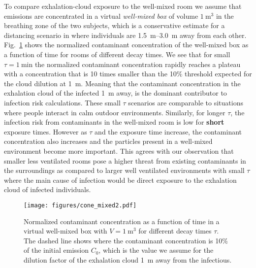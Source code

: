 \documentclass[preprint]{elsarticle}
\begin{document}
To compare exhalation-cloud exposure to the well-mixed room we assume that emissions are concentrated in a virtual \emph{well-mixed box} of volume $\SI{1}{\meter^{3}}$ in the breathing zone of the two subjects, which is a conservative estimate for a distancing scenario in where individuals are \SIrange[range-phrase=-]{1.5}{3.0}{\meter} away from each other.
Fig.~\ref{fig:dose ratio} shows the normalized contaminant concentration of the well-mixed box as a function of time for rooms of different decay times. 
We see that for small $\tau=\SI{1}{\minute}$ the normalized contaminant concentration rapidly reaches a plateau with a concentration that is 10 times smaller than the 10\% threshold expected for the cloud dilution at \SI{1}{\meter}.
Meaning that the contaminant concentration in the exhalation cloud of the infected \SI{1}{\meter} away, is the dominant contributor to infection risk calculations.
These small $\tau$ scenarios are comparable to situations where people interact in calm outdoor environments.
Similarly, for longer $\tau$, the infection risk from contaminants in the well-mixed room is low for \textbf{short} exposure times. 
However as $\tau$ and the exposure time increase, the contaminant concentration also increases and the particles present in a well-mixed environment become more important.
This agrees with our observation that smaller less ventilated rooms pose a higher threat from existing contaminants in the surroundings as compared to larger well ventilated environments with small $\tau$ where the main cause of infection would be direct exposure to the exhalation cloud of infected individuals.


\begin{figure}[!htbp]
	\centering
	\texttt{[image: figures/cone\_mixed2.pdf]}
	\caption{Normalized contaminant concentration as a function of time in a virtual well-mixed box with $V=\SI{1}{\meter^{3}}$ for different decay times $\tau$. The dashed line shows where the contaminant concentration is 10\% of the initial emission $C_{0}$, which is the value we assume for the dilution factor of the exhalation cloud \SI{1}{\meter} away from the infectious.}
	\label{fig:dose ratio}
\end{figure}
\end{document}
